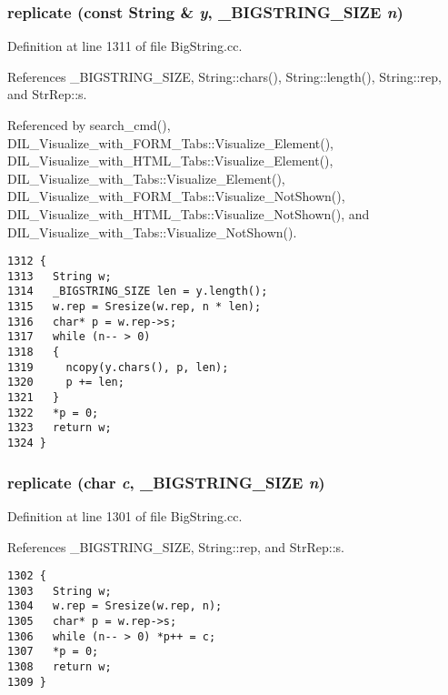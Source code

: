 \subsubsection{ replicate (const {\bf String} \& {\em y}, {\bf \_\-BIGSTRING\_\-SIZE} {\em n})}\label{BigString_8cc_a39}




Definition at line 1311 of file Big\-String.cc.

References \_\-BIGSTRING\_\-SIZE, String::chars(), String::length(), String::rep, and Str\-Rep::s.

Referenced by search\_\-cmd(), DIL\_\-Visualize\_\-with\_\-FORM\_\-Tabs::Visualize\_\-Element(), DIL\_\-Visualize\_\-with\_\-HTML\_\-Tabs::Visualize\_\-Element(), DIL\_\-Visualize\_\-with\_\-Tabs::Visualize\_\-Element(), DIL\_\-Visualize\_\-with\_\-FORM\_\-Tabs::Visualize\_\-Not\-Shown(), DIL\_\-Visualize\_\-with\_\-HTML\_\-Tabs::Visualize\_\-Not\-Shown(), and DIL\_\-Visualize\_\-with\_\-Tabs::Visualize\_\-Not\-Shown().



\footnotesize\begin{verbatim}1312 {
1313   String w;
1314   _BIGSTRING_SIZE len = y.length();
1315   w.rep = Sresize(w.rep, n * len);
1316   char* p = w.rep->s;
1317   while (n-- > 0)
1318   {
1319     ncopy(y.chars(), p, len);
1320     p += len;
1321   }
1322   *p = 0;
1323   return w;
1324 }
\end{verbatim}\normalsize 
{}
\subsubsection{ replicate (char {\em c}, {\bf \_\-BIGSTRING\_\-SIZE} {\em n})}\label{BigString_8cc_a38}




Definition at line 1301 of file Big\-String.cc.

References \_\-BIGSTRING\_\-SIZE, String::rep, and Str\-Rep::s.



\footnotesize\begin{verbatim}1302 {
1303   String w;
1304   w.rep = Sresize(w.rep, n);
1305   char* p = w.rep->s;
1306   while (n-- > 0) *p++ = c;
1307   *p = 0;
1308   return w;
1309 }
\end{verbatim}\normalsize 
{}
